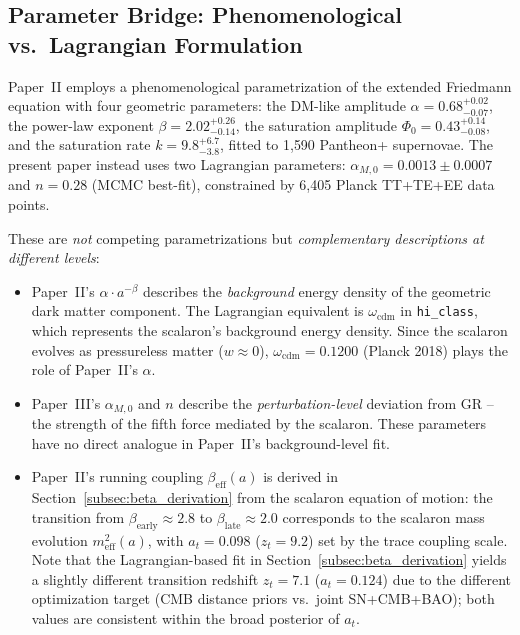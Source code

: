 \documentclass[aps,prd,twocolumn,superscriptaddress,nofootinbib]{revtex4-2}
\begin{document}
\subsection{Parameter Bridge: Phenomenological vs.\ Lagrangian Formulation}
\label{subsec:parameter_bridge}

Paper~II employs a phenomenological parametrization of the extended Friedmann equation with four geometric parameters: the DM-like amplitude $\alpha = 0.68^{+0.02}_{-0.07}$, the power-law exponent $\beta = 2.02^{+0.26}_{-0.14}$, the saturation amplitude $\Phi_0 = 0.43^{+0.14}_{-0.08}$, and the saturation rate $k = 9.8^{+6.7}_{-3.8}$, fitted to 1{,}590 Pantheon+ supernovae. The present paper instead uses two Lagrangian parameters: $\alpha_{M,0} = 0.0013 \pm 0.0007$ and $n = 0.28$ (MCMC best-fit), constrained by 6{,}405 Planck TT+TE+EE data points.

These are \textit{not} competing parametrizations but \textit{complementary descriptions at different levels}:
\begin{itemize}
\item Paper~II's $\alpha \cdot a^{-\beta}$ describes the \textit{background} energy density of the geometric dark matter component. The Lagrangian equivalent is $\omega_{\mathrm{cdm}}$ in \texttt{hi\_class}, which represents the scalaron's background energy density. Since the scalaron evolves as pressureless matter ($w \approx 0$), $\omega_{\mathrm{cdm}} = 0.1200$ (Planck 2018) plays the role of Paper~II's $\alpha$.
\item Paper~III's $\alpha_{M,0}$ and $n$ describe the \textit{perturbation-level} deviation from GR -- the strength of the fifth force mediated by the scalaron. These parameters have no direct analogue in Paper~II's background-level fit.
\item Paper~II's running coupling $\beta_{\mathrm{eff}}(a)$ is derived in Section~\ref{subsec:beta_derivation} from the scalaron equation of motion: the transition from $\beta_{\mathrm{early}} \approx 2.8$ to $\beta_{\mathrm{late}} \approx 2.0$ corresponds to the scalaron mass evolution $m_{\mathrm{eff}}^2(a)$, with $a_t = 0.098$ ($z_t = 9.2$) set by the trace coupling scale. Note that the Lagrangian-based fit in Section~\ref{subsec:beta_derivation} yields a slightly different transition redshift $z_t = 7.1$ ($a_t = 0.124$) due to the different optimization target (CMB distance priors vs.\ joint SN+CMB+BAO); both values are consistent within the broad posterior of $a_t$.
\end{itemize}
\end{document}
